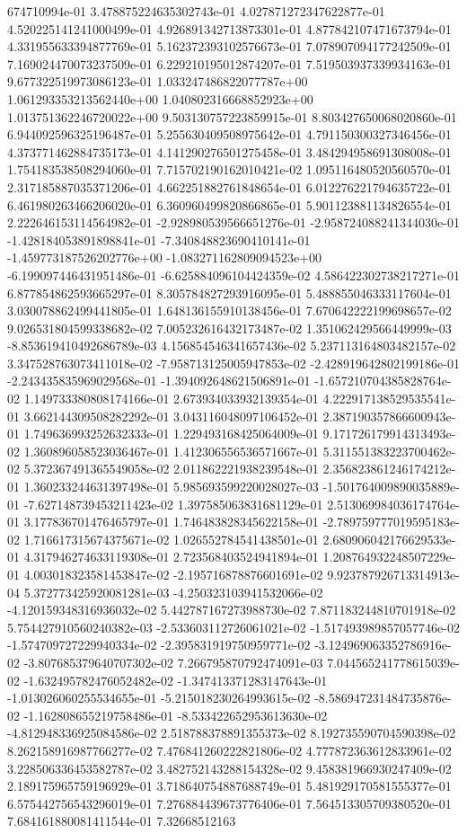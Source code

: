 674710994e-01	3.478875224635302743e-01	4.027871272347622877e-01	4.520225141241000499e-01	4.926891342713873301e-01	4.877842107471673794e-01	4.331955633394877769e-01	5.162372393102576673e-01	7.078907094177242509e-01	7.169024470073237509e-01	6.229210195012874207e-01	7.519503937339934163e-01	9.677322519973086123e-01	1.033247486822077787e+00	1.061293353213562440e+00	1.040802316668852923e+00	1.013751362246720022e+00	9.503130757223859915e-01	8.803427650068020860e-01	6.944092596325196487e-01	5.255630409508975642e-01	4.791150300327346456e-01	4.373771462884735173e-01	4.141290276501275458e-01	3.484294958691308008e-01	1.754183538508294060e-01	7.715702190162010421e-02	1.095116480520560570e-01	2.317185887035371206e-01	4.662251882761848654e-01	6.012276221794635722e-01	6.461980263466206020e-01	6.360960499820866865e-01	5.901123881134826554e-01	2.222646153114564982e-01	-2.928980539566651276e-01	-2.958724088241344030e-01	-1.428184053891898841e-01	-7.340848823690410141e-01	-1.459773187526202776e+00	-1.083271162809094523e+00	-6.199097446431951486e-01	-6.625884096104424359e-02	4.586422302738217271e-01	6.877854862593665297e-01	8.305784827293916095e-01	5.488855046333117604e-01	3.030078862499441805e-01	1.648136155910138456e-01	7.670642222199698657e-02	9.026531804599338682e-02	7.005232616432173487e-02	1.351062429566449999e-03	-8.853619410492686789e-03	4.156854546341657436e-02	5.237113164803482157e-02	3.347528763073411018e-02	-7.958713125005947853e-02	-2.428919642802199186e-01	-2.243435835969029568e-01	-1.394092648621506891e-01	-1.657210704385828764e-02	1.149733380808174166e-01	2.673934033932139354e-01	4.222917138529535541e-01	3.662144309508282292e-01	3.043116048097106452e-01	2.387190357866600943e-01	1.749636993252632333e-01	1.229493168425064009e-01	9.171726179914313493e-02	1.360896058523036467e-01	1.412306556536571667e-01	5.311551383223700462e-02	5.372367491365549058e-02	2.011862221938239548e-01	2.356823861246174212e-01	1.360233244631397498e-01	5.985693599220028027e-03	-1.501764009890035889e-01	-7.627148739453211423e-02	1.397585063831681129e-01	2.513069984036174764e-01	3.177836701476465797e-01	1.746483828345622158e-01	-2.789759777019595183e-02	1.716617315674375671e-02	1.026552784541438501e-01	2.680906042176629533e-01	4.317946274633119308e-01	2.723568403524941894e-01	1.208764932248507229e-01	4.003018323581453847e-02	-2.195716878876601691e-02	9.923787926713314913e-04	5.372773425920081281e-03	-4.250323103941532066e-02	-4.120159348316936032e-02	5.442787167273988730e-02	7.871183244810701918e-02	5.754427910560240382e-03	-2.533603112726061021e-02	-1.517493989857057746e-02	-1.574709727229940334e-02	-2.395831919750959771e-02	-3.124969063352786916e-02	-3.807685379640707302e-02	7.266795870792474091e-03	7.044565241778615039e-02	-1.632495782476052482e-02	-1.347413371283147643e-01	-1.013026060255534655e-01	-5.215018230264993615e-02	-8.586947231484735876e-02	-1.162808655219758486e-01	-8.533422652953613630e-02	-4.812948336925084586e-02	2.518788378891355373e-02	8.192735590704590398e-02	8.262158916987766277e-02	7.476841260222821806e-02	4.777872363612833961e-02	3.228506336453582787e-02	3.482752143288154328e-02	9.458381966930247409e-02	2.189175965759196929e-01	3.718640754887688749e-01	5.481929170581555377e-01	6.575442756543296019e-01	7.276884439673776406e-01	7.564513305709380520e-01	7.684161880081411544e-01	7.32668512163